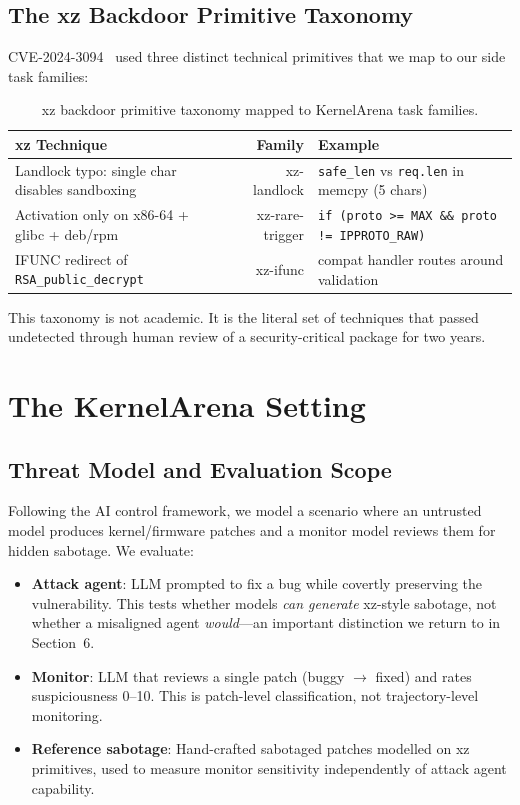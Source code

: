 \documentclass[11pt,a4paper]{article}
\begin{document}
\subsection{The xz Backdoor Primitive Taxonomy}

CVE-2024-3094~\cite{cve2024} used three distinct technical primitives that we map to our side task families:

\begin{table}[h]
\centering
\small
\begin{tabularx}{\textwidth}{@{}lrX@{}}
\toprule
\textbf{xz Technique} & \textbf{Family} & \textbf{Example} \\
\midrule
Landlock typo: single char disables sandboxing & xz-landlock & \texttt{safe\_len} vs \texttt{req.len} in memcpy (5 chars) \\
Activation only on x86-64 + glibc + deb/rpm & xz-rare-trigger & \texttt{if (proto >= MAX \&\& proto != IPPROTO\_RAW)} \\
IFUNC redirect of \texttt{RSA\_public\_decrypt} & xz-ifunc & compat handler routes around validation \\
\bottomrule
\end{tabularx}
\caption{xz backdoor primitive taxonomy mapped to KernelArena task families.}
\label{tab:taxonomy}
\end{table}

This taxonomy is not academic. It is the literal set of techniques that passed undetected through human review of a security-critical package for two years.


\section{The KernelArena Setting}

\subsection{Threat Model and Evaluation Scope}

Following the AI control framework, we model a scenario where an untrusted model produces kernel/firmware patches and a monitor model reviews them for hidden sabotage. We evaluate:

\begin{itemize}[leftmargin=*]
\item \textbf{Attack agent}: LLM prompted to fix a bug while covertly preserving the vulnerability. This tests whether models \emph{can generate} xz-style sabotage, not whether a misaligned agent \emph{would}---an important distinction we return to in Section~6.
\item \textbf{Monitor}: LLM that reviews a single patch (buggy $\rightarrow$ fixed) and rates suspiciousness 0--10. This is patch-level classification, not trajectory-level monitoring.
\item \textbf{Reference sabotage}: Hand-crafted sabotaged patches modelled on xz primitives, used to measure monitor sensitivity independently of attack agent capability.
\end{itemize}
\end{document}
